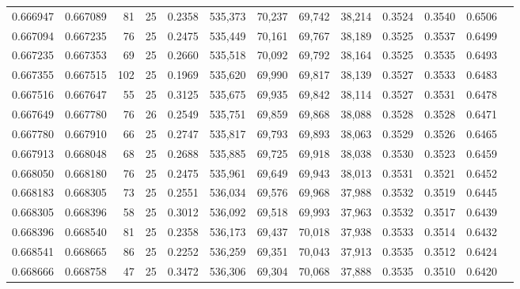\begin{tabular}{rrrrrrrrrrrrr}
0.666947 & 0.667089 &    81 &  25 &                                     0.2358 & 535,373 &  70,237 &  69,742 &  38,214 & 0.3524 & 0.3540 & 0.6506 \\
0.667094 & 0.667235 &    76 &  25 &                                     0.2475 & 535,449 &  70,161 &  69,767 &  38,189 & 0.3525 & 0.3537 & 0.6499 \\
0.667235 & 0.667353 &    69 &  25 &                                     0.2660 & 535,518 &  70,092 &  69,792 &  38,164 & 0.3525 & 0.3535 & 0.6493 \\
0.667355 & 0.667515 &   102 &  25 &                                     0.1969 & 535,620 &  69,990 &  69,817 &  38,139 & 0.3527 & 0.3533 & 0.6483 \\
0.667516 & 0.667647 &    55 &  25 &                                     0.3125 & 535,675 &  69,935 &  69,842 &  38,114 & 0.3527 & 0.3531 & 0.6478 \\
0.667649 & 0.667780 &    76 &  26 &                                     0.2549 & 535,751 &  69,859 &  69,868 &  38,088 & 0.3528 & 0.3528 & 0.6471 \\
0.667780 & 0.667910 &    66 &  25 &                                     0.2747 & 535,817 &  69,793 &  69,893 &  38,063 & 0.3529 & 0.3526 & 0.6465 \\
0.667913 & 0.668048 &    68 &  25 &                                     0.2688 & 535,885 &  69,725 &  69,918 &  38,038 & 0.3530 & 0.3523 & 0.6459 \\
0.668050 & 0.668180 &    76 &  25 &                                     0.2475 & 535,961 &  69,649 &  69,943 &  38,013 & 0.3531 & 0.3521 & 0.6452 \\
0.668183 & 0.668305 &    73 &  25 &                                     0.2551 & 536,034 &  69,576 &  69,968 &  37,988 & 0.3532 & 0.3519 & 0.6445 \\
0.668305 & 0.668396 &    58 &  25 &                                     0.3012 & 536,092 &  69,518 &  69,993 &  37,963 & 0.3532 & 0.3517 & 0.6439 \\
0.668396 & 0.668540 &    81 &  25 &                                     0.2358 & 536,173 &  69,437 &  70,018 &  37,938 & 0.3533 & 0.3514 & 0.6432 \\
0.668541 & 0.668665 &    86 &  25 &                                     0.2252 & 536,259 &  69,351 &  70,043 &  37,913 & 0.3535 & 0.3512 & 0.6424 \\
0.668666 & 0.668758 &    47 &  25 &                                     0.3472 & 536,306 &  69,304 &  70,068 &  37,888 & 0.3535 & 0.3510 & 0.6420 \\

\end{tabular}
